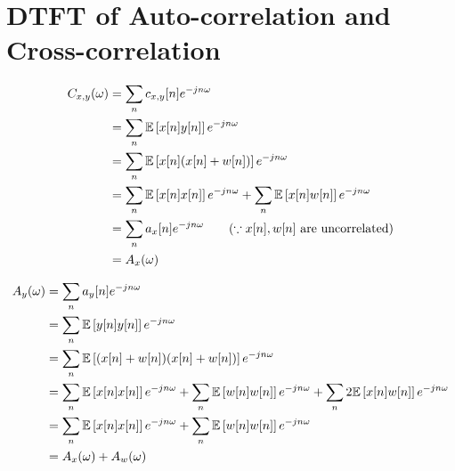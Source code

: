 \section{DTFT of Auto-correlation and Cross-correlation}\label{sec:p1}

\begin{align*}
	C_{x,y}(\omega) 
	&= \sum_{n} c_{x,y}[n]e^{-jn\omega} \\
	&= \sum_{n} \mathbb{E} \left[ x[n]y[n] \right] e^{-jn\omega} \\
	&= \sum_{n} \mathbb{E} \left[ x[n](x[n]+w[n]) \right] e^{-jn\omega} \\
	&= \sum_{n} \mathbb{E} \left[ x[n]x[n] \right] e^{-jn\omega} + \sum_{n} \mathbb{E} \left[ x[n]w[n] \right] e^{-jn\omega}\\
	&= \sum_{n} a_x[n] e^{-jn\omega} \qquad (\because x[n], w[n] \text{ are uncorrelated}) \\
	&= A_x(\omega)
\end{align*}

\begin{align*}
	A_y(\omega)
	&= \sum_{n} a_{y}[n]e^{-jn\omega} \\
	&= \sum_{n} \mathbb{E} \left[ y[n]y[n] \right] e^{-jn\omega} \\
	&= \sum_{n} \mathbb{E} \left[ (x[n]+w[n])(x[n]+w[n]) \right] e^{-jn\omega} \\
	&= \sum_{n} \mathbb{E} \left[ x[n]x[n] \right] e^{-jn\omega} + \sum_{n} \mathbb{E} \left[ w[n]w[n] \right] e^{-jn\omega} + \sum_{n} 2\mathbb{E} \left[ x[n]w[n] \right] e^{-jn\omega}\\
	&= \sum_{n} \mathbb{E} \left[ x[n]x[n] \right] e^{-jn\omega} + \sum_{n} \mathbb{E} \left[ w[n]w[n] \right] e^{-jn\omega} \\
	&= A_x(\omega) + A_w(\omega)
\end{align*}